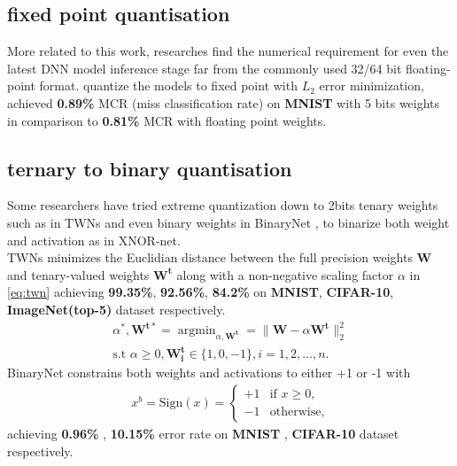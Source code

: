 \subsection{fixed point quantisation}
More related to this work, researches find the numerical requirement for even the latest DNN model inference stage far from the commonly used 32/64 bit floating-point format. \cite{FixedPoint} quantize the models to fixed point with ${L_2}$ error minimization, achieved \textbf{0.89\%} MCR (miss classification rate) on \textbf{MNIST} with 5 bits weights in comparison to \textbf{0.81\%} MCR with floating point weights.
\subsection{ternary to binary quantisation}
Some researchers have tried extreme quantization down to 2bits tenary weights such as in TWNs\cite{Ternary} and even binary weights in BinaryNet \cite{BinaryNet}, to binarize both weight and activation as in XNOR-net\cite{XnorNet}. \\
TWNs minimizes the Euclidian distance between the full precision weights $\boldsymbol{W}$ and tenary-valued weights $\boldsymbol{W^t}$ along with a non-negative scaling factor $\alpha$ in \eqref{eq:twn} achieving \textbf{99.35\%}, \textbf{92.56\%}, \textbf{84.2\%} on \textbf{MNIST}, \textbf{CIFAR-10}, \textbf{ImageNet(top-5)} dataset respectively.  
\begin{equation}
\begin{aligned}\label{eq:twn}
    \alpha^*, \boldsymbol{W^{t*}} = \mathop{\arg\min}_{\alpha,\boldsymbol{W^t}} = \|\boldsymbol{W}-\alpha\boldsymbol{W^t}\|^2_2 \\  
\text{s.t }\alpha\geq0,\boldsymbol{W^t_i}\in\{1,0,-1\}, i=1,2,...,n.
\end{aligned}
\end{equation}
BinaryNet constrains both weights and activations to either +1 or -1 with 
\begin{equation}
    \begin{aligned}\label{eq:bn}
        x^b=\text{Sign}(x)=\begin{cases}
                        +1 &\text{if \(x\geq0\)}, \\
                        -1 &\text{otherwise},
                    \end{cases}
    \end{aligned}
\end{equation}
achieving \textbf{0.96\%} , \textbf{10.15\%} error rate on \textbf{MNIST} , \textbf{CIFAR-10} dataset respectively.
